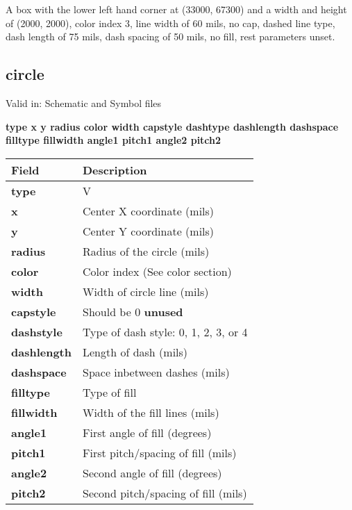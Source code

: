 \documentclass{article}
\begin{document}
A box with the lower left hand corner at (33000, 67300) and a width and height
of (2000, 2000), color index 3, line width of 60 mils, no cap, dashed line 
type, dash length of 75 mils, dash spacing of 50 mils, no fill, rest parameters 
unset.

\subsection{circle}

Valid in: Schematic and Symbol files

{\bf type x y radius color width capstyle dashtype dashlength dashspace filltype fillwidth angle1 pitch1 angle2 pitch2 }

\begin{table}[h]
\begin{tabular}{|l|l|} \hline
Field & Description \\ \hline \hline
{\bf type} & V \\ \hline
{\bf x} & Center X coordinate (mils) \\ \hline 
{\bf y} & Center Y coordinate (mils)\\ \hline
{\bf radius} & Radius of the circle (mils) \\ \hline
{\bf color} & Color index (See color section) \\ \hline
{\bf width} & Width of circle line (mils) \\ \hline
{\bf capstyle} & Should be 0 {\bf unused} \\ \hline
{\bf dashstyle} & Type of dash style: 0, 1, 2, 3, or 4 \\ \hline
{\bf dashlength} & Length of dash (mils) \\ \hline
{\bf dashspace} & Space inbetween dashes (mils) \\ \hline
{\bf filltype} & Type of fill \\ \hline
{\bf fillwidth} & Width of the fill lines (mils) \\ \hline
{\bf angle1} & First angle of fill (degrees) \\ \hline
{\bf pitch1} & First pitch/spacing of fill (mils) \\ \hline
{\bf angle2} & Second angle of fill (degrees) \\ \hline
{\bf pitch2} & Second pitch/spacing of fill (mils) \\ \hline
\end{tabular}
\end{table}
\end{document}
